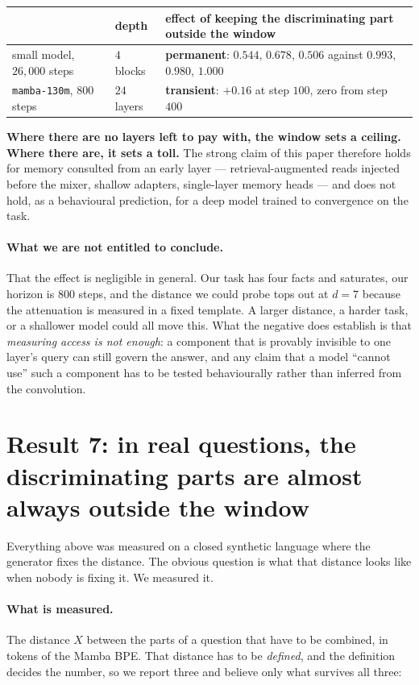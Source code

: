 \documentclass[11pt,a4paper]{article}
\begin{document}
\begin{center}
\begin{tabular}{lll}
\toprule
& depth & effect of keeping the discriminating part outside the window \\
\midrule
small model, $26{,}000$ steps & $4$ blocks & \textbf{permanent}: $0.544$, $0.678$, $0.506$ against $0.993$, $0.980$, $1.000$ \\
\texttt{mamba-130m}, $800$ steps & $24$ layers & \textbf{transient}: $+0.16$ at step $100$, zero from step $400$ \\
\bottomrule
\end{tabular}
\end{center}

\textbf{Where there are no layers left to pay with, the window sets a ceiling. Where there are, it
sets a toll.} The strong claim of this paper therefore holds for memory consulted from an early layer
--- retrieval-augmented reads injected before the mixer, shallow adapters, single-layer memory heads
--- and does not hold, as a behavioural prediction, for a deep model trained to convergence on the
task.

\paragraph{What we are not entitled to conclude.} That the effect is negligible in general. Our task
has four facts and saturates, our horizon is $800$ steps, and the distance we could probe tops out at
$d{=}7$ because the attenuation is measured in a fixed template. A larger distance, a harder task, or
a shallower model could all move this. What the negative does establish is that \emph{measuring access
is not enough}: a component that is provably invisible to one layer's query can still govern the
answer, and any claim that a model ``cannot use'' such a component has to be tested behaviourally
rather than inferred from the convolution.

\section{Result 7: in real questions, the discriminating parts are almost always outside the window}

Everything above was measured on a closed synthetic language where the generator fixes the distance.
The obvious question is what that distance looks like when nobody is fixing it. We measured it.

\paragraph{What is measured.} The distance $X$ between the parts of a question that have to be
combined, in tokens of the Mamba BPE. That distance has to be \emph{defined}, and the definition
decides the number, so we report three and believe only what survives all three:
\end{document}
